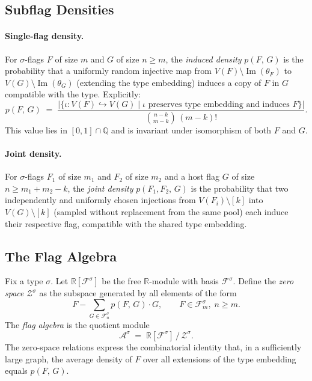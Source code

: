 \documentclass{article}
\newcommand{\den}[2]{p(#1,\,#2)}
\begin{document}
\subsection{Subflag Densities}

\paragraph{Single-flag density.}
For $\sigma$-flags $F$ of size $m$ and $G$ of size $n \geq m$, the
\emph{induced density} $\den{F}{G}$ is the probability that a uniformly
random injective map from $V(F) \setminus \operatorname{Im}(\theta_F)$ to
$V(G) \setminus \operatorname{Im}(\theta_G)$ (extending the type embedding)
induces a copy of $F$ in $G$ compatible with the type.  Explicitly:
\[
  \den{F}{G}
  \;=\;
  \frac{\bigl|\{\iota : V(F) \hookrightarrow V(G)
                  \mid \iota \text{ preserves type embedding and induces }F\}\bigr|}
       {\binom{n-k}{m-k}\,(m-k)!}.
\]
This value lies in $[0,1] \cap \mathbb{Q}$ and is invariant under
isomorphism of both $F$ and $G$.

\paragraph{Joint density.}
For $\sigma$-flags $F_1$ of size $m_1$ and $F_2$ of size $m_2$ and a host
flag $G$ of size $n \geq m_1 + m_2 - k$, the \emph{joint density}
$\den{F_1,F_2}{G}$ is the probability that two independently and uniformly
chosen injections from $V(F_i)\setminus [k]$ into $V(G)\setminus [k]$
(sampled without replacement from the same pool) each induce their
respective flag, compatible with the shared type embedding.

\subsection{The Flag Algebra}

Fix a type $\sigma$.  Let $\mathbb{R}[\mathcal{F}^\sigma]$ be the free
$\mathbb{R}$-module with basis $\mathcal{F}^\sigma$.
Define the \emph{zero space} $\mathcal{Z}^\sigma$ as the subspace generated
by all elements of the form
\[
  F - \sum_{G \in \mathcal{F}^\sigma_n} \den{F}{G} \cdot G,
  \qquad F \in \mathcal{F}^\sigma_m,\; n \geq m.
\]
The \emph{flag algebra} is the quotient module
\[
  \mathcal{A}^\sigma \;=\; \mathbb{R}[\mathcal{F}^\sigma] \,/\, \mathcal{Z}^\sigma.
\]
The zero-space relations express the combinatorial identity that, in a
sufficiently large graph, the average density of $F$ over all extensions of
the type embedding equals $\den{F}{G}$.
\end{document}

